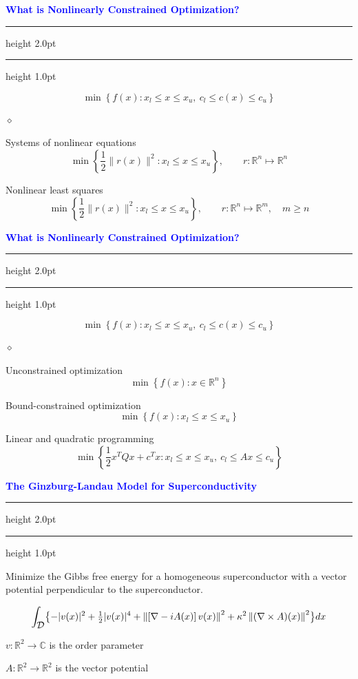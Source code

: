 \documentclass{seminar}
\newcommand{\R}{\mbox{${\mathbb R}$}}
\newcommand{\C}{\mbox{${\mathbb C}$}}
\newcommand{\grad}{\nabla}
\newcommand{\half}{{\textstyle{\frac{1}{2}}}}
\newcommand{\reddiamond}{\textcolor{BrickRed}{$\diamond$}}
\newcommand{\redstripe}{\textcolor{BrickRed}{\hrule height 2.0pt\hfil}
             \vspace{-1.8pt}
             \textcolor{BrickRed}{\hrule height 1.0pt\hfil}
}
\newcommand{\heading}[1]{%
   \vspace*{0.5pt}%
   \centerline{\textcolor{Blue}{\textbf{#1}}}%
   \redstripe
}
\newcommand{\cD} {\mbox{$\cal D$}}
\begin{document}
\begin{slide}

\heading{What is Nonlinearly Constrained Optimization?}

\[
\min \left \{ f(x): x_l \le x \le x_u , \ c_l \le c(x) \le c_u \right \}
\]

\medskip

\begin{list}{\reddiamond}
{
}
\item
Systems of nonlinear equations
\[
\min \left \{ \half \| r(x) \|^2 : x_l \le x \le x_u \right \} , \qquad
r : \R^n \mapsto \R^n
\]
\item
Nonlinear least squares
\[
\min \left \{ \half \| r(x) \|^2 : x_l \le x \le x_u \right \} , \qquad
r : \R^n \mapsto \R^m, \quad m \ge n
\]
\end{list}

\vfill

\end{slide}

\begin{slide}

\heading{What is Nonlinearly Constrained Optimization?}

\[
\min \left \{ f(x): x_l \le x \le x_u , \ c_l \le c(x) \le c_u \right \}
\]

\medskip

\begin{list}{\reddiamond}
{
}
\item
Unconstrained optimization
\[
\min \left \{  f(x) : x \in \R^n \right \}
\]
\item
Bound-constrained optimization
\[
\min \left \{  f(x) : x_l \le x \le x_u \right \}
\]
\item
Linear and quadratic programming
\[
\min \left \{ \half x^T Q x + c^T x : x_l \le x \le x_u , 
\ c_l \le Ax \le c_u \right \}
\]
\end{list}

\vfill

\end{slide}

\begin{slide}

\heading{The Ginzburg-Landau Model for Superconductivity}

Minimize the Gibbs free energy for a homogeneous superconductor with a vector
potential perpendicular to the superconductor.

{\small
\[
\int _ {\cD} \bigl \{ - | v (x) |^2 + \half | v (x) |^4  + 
\left \| \left [ \nabla - i A(x) \right ] v (x) \right \| ^2  +  \\
\kappa^2 \left \| ( \grad \times A ) (x) \right \| ^2 \bigr \} dx
\]
}

\medskip

\begin{center}
$ v : \R^2 \to \C$ is the order parameter

$A : \R^2 \to \R^2 $ is the vector potential
\end{center}

\vfill

\end{slide}
\end{document}
